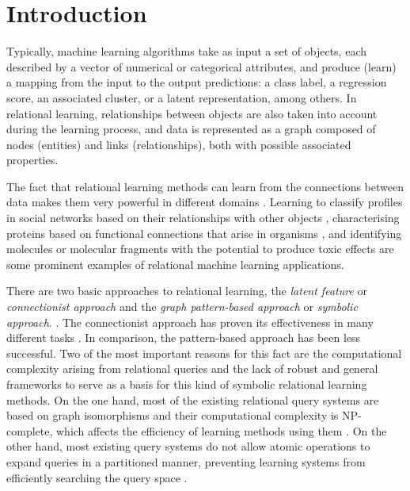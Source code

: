 \documentclass[mathematics,article,submit,pdftex,moreauthors]{Definitions/mdpi}
\begin{document}
\section{Introduction}

Typically, machine learning algorithms take as input a set of objects, each described by a vector of numerical or categorical attributes, and produce (learn) a mapping from the input to the output predictions: a class label, a regression score, an associated cluster, or a latent representation, among others. In relational learning, relationships between objects are also taken into account during the learning process, and data is represented as a graph composed of nodes (entities) and links (relationships), both with possible associated properties.

The fact that relational learning methods can learn from the connections between data makes them very powerful in different domains \citep{Jacob:2014:LLR:2556195.2556225,webscale,6802366,lee2023conditional}. Learning to classify profiles in social networks based on their relationships with other objects \citep{tang2009relational,fan_2012}, characterising proteins based on functional connections that arise in organisms \citep{10.1007/978-3-642-23038-7_12}, and identifying molecules or molecular fragments with the potential to produce toxic effects \citep{camacho2011relational} are some prominent examples of relational machine learning applications.

There are two basic approaches to relational learning, the \textit{latent feature} or \textit{connectionist approach} and the \textit{ graph pattern-based approach} or \textit{symbolic approach}. \citep{de_raedt_2021}. The connectionist approach has proven its effectiveness in many different tasks \citep{kazemi2018relational,wu2022graph,zhou2020graph,ahmed2023adalnn,pacheco2021modeling,wang2020nodeaug}. In comparison, the pattern-based approach has been less successful. Two of the most important reasons for this fact are the computational complexity arising from relational queries and the lack of robust and general frameworks to serve as a basis for this kind of symbolic relational learning methods. On the one hand, most of the existing relational query systems are based on graph isomorphisms and their computational complexity is NP-complete, which affects the efficiency of learning methods using them \citep{latouche2015graphs}. On the other hand, most existing query systems do not allow atomic operations to expand queries in a partitioned manner, preventing learning systems from efficiently searching the query space \citep{Knobbe99multi-relationaldecision}. 
\end{document}
